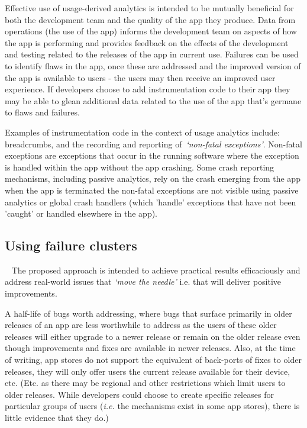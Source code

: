 Effective use of usage-derived analytics is intended to be mutually beneficial for both the development team and the quality of the app they produce. Data from operations (the use of the app) informs the development team on aspects of how the app is performing and provides feedback on the effects of the development and testing related to the releases of the app in current use. Failures can be used to identify flaws in the app, once these are addressed and the improved version of the app is available to users - the users may then receive an improved user experience. If developers choose to add instrumentation code to their app they may be able to glean additional data related to the use of the app that's germane to flaws and failures.

Examples of instrumentation code in the context of usage analytics include: breadcrumbs, and the recording and reporting of~\emph{`non-fatal exceptions'}. Non-fatal exceptions are exceptions that occur in the running software where the exception is handled within the app without the app crashing. Some crash reporting mechanisms, including passive analytics, rely on the crash emerging from the app when the app is terminated the non-fatal exceptions are not visible using passive analytics or global crash handlers (which 'handle' exceptions that have not been 'caught' or handled elsewhere in the app).



\subsection{Using failure clusters}~\label{section-select-aggregate-scope-analyse-triage-and-prioritise}
The proposed approach is intended to achieve practical results efficaciously and address real-world issues that \emph{`move the needle'} i.e. that will deliver positive improvements. 

A half-life of bugs worth addressing, where bugs that surface primarily in older releases of an app are less worthwhile to address as the users of these older releases will either upgrade to a newer release or remain on the older release even though improvements and fixes are available in newer releases. Also, at the time of writing, app stores do not support the equivalent of back-ports of fixes to older releases, they will only offer users the current release available for their device, etc. (Etc. as there may be regional and other restrictions which limit users to older releases. While developers could choose to create specific releases for particular groups of users (\emph{i.e.} the mechanisms exist in some app stores), there is little evidence that they do.)

